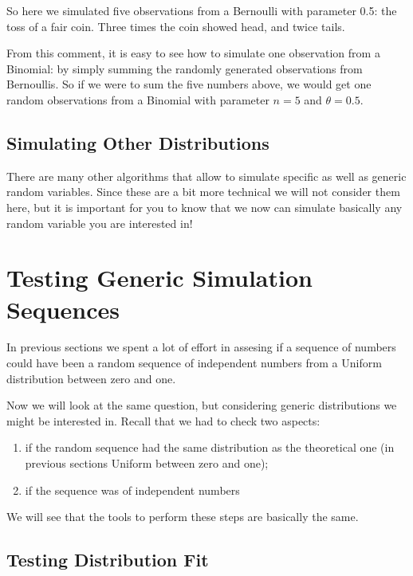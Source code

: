\documentclass[
]{book}
\theoremstyle{definition}
\theoremstyle{definition}
\theoremstyle{definition}
\theoremstyle{definition}
\theoremstyle{remark}
\begin{document}
So here we simulated five observations from a Bernoulli with parameter 0.5: the toss of a fair coin. Three times the coin showed head, and twice tails.

From this comment, it is easy to see how to simulate one observation from a Binomial: by simply summing the randomly generated observations from Bernoullis. So if we were to sum the five numbers above, we would get one random observations from a Binomial with parameter \(n=5\) and \(\theta=0.5\).

\hypertarget{simulating-other-distributions}{%
\subsection{Simulating Other Distributions}\label{simulating-other-distributions}}

There are many other algorithms that allow to simulate specific as well as generic random variables. Since these are a bit more technical we will not consider them here, but it is important for you to know that we now can simulate basically any random variable you are interested in!

\hypertarget{testing-generic-simulation-sequences}{%
\section{Testing Generic Simulation Sequences}\label{testing-generic-simulation-sequences}}

In previous sections we spent a lot of effort in assesing if a sequence of numbers could have been a random sequence of independent numbers from a Uniform distribution between zero and one.

Now we will look at the same question, but considering generic distributions we might be interested in. Recall that we had to check two aspects:

\begin{enumerate}
\def\labelenumi{\arabic{enumi}.}
\item
  if the random sequence had the same distribution as the theoretical one (in previous sections Uniform between zero and one);
\item
  if the sequence was of independent numbers
\end{enumerate}

We will see that the tools to perform these steps are basically the same.

\hypertarget{testing-distribution-fit}{%
\subsection{Testing Distribution Fit}\label{testing-distribution-fit}}
\end{document}
